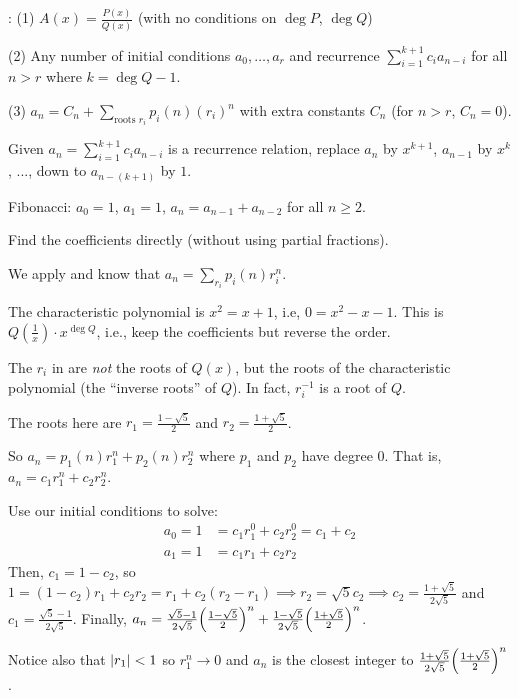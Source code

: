 \begin{theorem}[Case 2]\label{thm:main2}
  \TFAE: (1) $A(x) = \frac{P(x)}{Q(x)}$ (with no conditions on $\deg P$, $\deg Q$)

  (2) Any number of initial conditions $a_0,\dotsc,a_r$
  and recurrence $\sum_{i=1}^{k+1}c_i a_{n-i}$ for all $n > r$ where $k = \deg Q -1$.

  (3) $a_n = C_n + \sum_{\text{roots $r_i$}}p_i(n)(r_i)^n$
  with extra constants $C_n$ (for $n > r$, $C_n = 0$).
\end{theorem}

\begin{defn}
  Given $a_n = \sum_{i=1}^{k+1}c_i a_{n-i}$ is a recurrence relation,
  replace $a_n$ by $x^{k+1}$, $a_{n-1}$ by $x^k$, ..., down to $a_{n-(k+1)}$ by $1$.
\end{defn}

\begin{example}
  Fibonacci: $a_0=1$, $a_1=1$, $a_n = a_{n-1} + a_{n-2}$ for all $n \geq 2$.

  Find the coefficients directly (without using partial fractions).
\end{example}
\begin{sol}
  We apply  and know that $a_n = \sum_{r_i} p_i(n) r_i^n$.

  The characteristic polynomial is $x^2 = x + 1$, i.e, $0 = x^2 - x - 1$.
  This is $Q(\frac{1}{x})\cdot x^{\deg Q}$, i.e.,
  keep the coefficients but reverse the order.

  The $r_i$ in  are \emph{not} the roots of $Q(x)$,
  but the roots of the characteristic polynomial (the ``inverse roots'' of $Q$).
  In fact, $r_i^{-1}$ is a root of $Q$.

  The roots here are $r_1 = \frac{1 - \sqrt 5}{2}$ and $r_2 = \frac{1 + \sqrt 5}{2}$.

  So $a_n = p_1(n) r_1^n + p_2(n) r_2^n$ where $p_1$ and $p_2$ have degree 0.
  That is, $a_n = c_1 r_1^n + c_2 r_2^n$.

  Use our initial conditions to solve:
  \begin{align*}
    a_0 = 1 & = c_1 r_1^0 + c_2 r_2^0 = c_1 + c_2 \\
    a_1 = 1 & = c_1 r_1 + c_2 r_2
  \end{align*}
  Then, $c_1 = 1-c_2$, so $1 = (1-c_2)r_1 + c_2 r_2  = r_1 + c_2(r_2-r_1)
    \implies r_2 = \sqrt{5}c_2 \implies c_2 = \frac{1+\sqrt{5}}{2\sqrt{5}}$
  and $c_1 = \frac{\sqrt{5}-1}{2\sqrt{5}}$.
  Finally, $a_n = \frac{\sqrt{5}-1}{2\sqrt{5}}\qty(\frac{1-\sqrt{5}}{2})^n
    + \frac{1-\sqrt{5}}{2\sqrt{5}}\qty(\frac{1+\sqrt{5}}{2})^n$.

  Notice also that $\abs{r_1}<1$ so $r_1^n \to 0$
  and $a_n$ is the closest integer to $\frac{1+\sqrt{5}}{2\sqrt{5}}\qty(\frac{1+\sqrt{5}}{2})^n$.
\end{sol}

